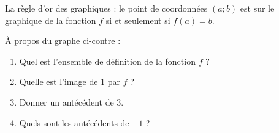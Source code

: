 \begin{Aprojeter}

    \begin{Aretenir}
        La règle d'or des graphiques : le point de coordonnées \( (a;b)\) est sur le graphique de la fonction \( f\) si et seulement si \( f(a)=b\).
    \end{Aretenir}



    \begin{multicols}{2}

    À propos du graphe ci-contre :
    \begin{enumerate}
        \item
            Quel est l'ensemble de définition de la fonction \( f\) ?
        \item
            Quelle est l'image de \( 1\) par \( f\) ?
        \item
            Donner un antécédent de \( 3\).
        \item
            Quels sont les antécédents de \( -1\) ?
    \end{enumerate}
        
        \columnbreak

    \begin{center}
       
    \end{center}

    \end{multicols}
\end{Aprojeter}



